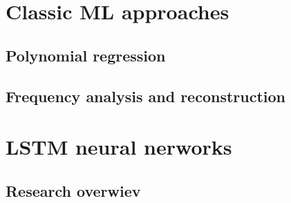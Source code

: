 \section{Classic ML approaches}

\subsection{Polynomial regression}

\subsection{Frequency analysis and reconstruction}


\section{LSTM neural nerworks}

\subsection{Research overwiev}
